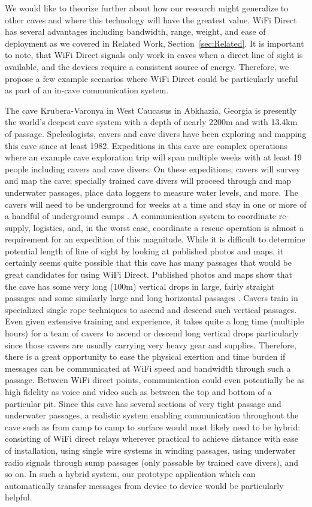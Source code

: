 \documentclass[10pt,twocolumn]{article}
\begin{document}
We would like to theorize further about how our research might generalize to other caves and where this technology will have the greatest value.
WiFi Direct has several advantages including bandwidth, range, weight, and ease of deployment as we covered in Related Work, Section~\ref{sec:Related}.
It is important to note, that WiFi Direct signals only work in caves when a direct line of sight is available, and the devices require a consistent source of energy.
Therefore, we propose a few example scenarios where WiFi Direct could be particularly useful as part of an in-cave communication system.

The cave Krubera-Varonya in West Caucasus in Abkhazia, Georgia is presently the world's deepest cave system with a depth of nearly 2200m and with 13.4km of passage. 
Speleologists, cavers and cave divers have been exploring and mapping this cave since at least 1982.
Expeditions in this cave are complex operations where an example cave exploration trip will span multiple weeks with at least 19 people including cavers and cave divers.
On these expeditions, cavers will survey and map the cave; specially trained cave divers will proceed through and map underwater passages, place data loggers to measure water levels, and more.
The cavers will need to be underground for weeks at a time and stay in one or more of a handful of underground camps \cite{krub_it}.
A communication system to coordinate re-supply, logistics, and, in the worst case, coordinate a rescue operation is almost a requirement for an expedition of this magnitude.
While it is difficult to determine potential length of line of sight by looking at published photos and maps, 
it certainly seems quite possible that this cave has many passages that would be great candidates for using WiFi Direct.
Published photos and maps show that the cave has some very long (100m) vertical drops in large, fairly straight passages and some similarly large and long horizontal passages \cite{krub_it}.
Cavers train in specialized single rope techniques to ascend and descend such vertical passages.
Even given extensive training and experience, it takes quite a long time (multiple hours) for a team of cavers to ascend or descend long vertical drops particularly since those cavers are usually carrying very heavy gear and supplies.
Therefore, there is a great opportunity to ease the physical exertion and time burden if messages can be communicated at WiFi speed and bandwidth through such a passage.
Between WiFi direct points, communication could even potentially be as high fidelity as voice and video such as between the top and bottom of a particular pit.
Since this cave has several sections of very tight passage and underwater passages,
a realistic system enabling communication throughout the cave such as from camp to camp to surface would most likely need to be hybrid:
consisting of WiFi direct relays wherever practical to achieve distance with ease of installation, using single wire systems in winding passages, using underwater radio signals through sump passages (only passable by trained cave divers), and so on.
In such a hybrid system, our prototype application which can automatically transfer messages from device to device would be particularly helpful.
\end{document}
